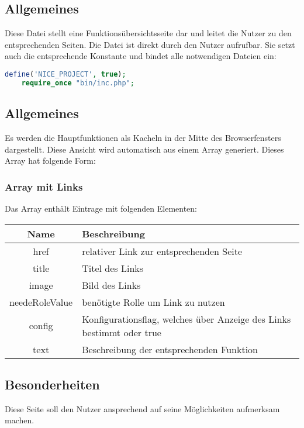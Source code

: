 \subsection{Allgemeines} Diese Datei stellt eine Funktionsübersichtsseite dar und leitet die Nutzer zu den entsprechenden Seiten.
Die Datei ist direkt durch den Nutzer aufrufbar. Sie setzt auch die entsprechende Konstante und bindet alle notwendigen Dateien ein:
\begin{lstlisting}[language=php]
	define('NICE_PROJECT', true);
	require_once "bin/inc.php";
\end{lstlisting}
\subsection{Allgemeines}
Es werden die Hauptfunktionen als Kacheln in der Mitte des Browserfensters dargestellt. Diese Ansicht wird automatisch aus einem Array generiert. Dieses Array hat folgende Form:
\subsubsection{Array mit Links} Das Array enthält Eintrage mit folgenden Elementen:
\begin{table}[H]
	\begin{tabular}{|c|p{11cm}|}
		\hline
		\textbf{Name} & \textbf{Beschreibung} \\ \hline
		href           & relativer Link zur entsprechenden Seite \\ \hline
		title          & Titel des Links \\ \hline
		image          & Bild des Links \\ \hline
		needeRoleValue & benötigte Rolle um Link zu nutzen \\ \hline
		config         & Konfigurationsflag, welches über Anzeige des Links bestimmt oder {\glqq true\grqq} \\ \hline
		text           & Beschreibung der entsprechenden Funktion \\ \hline
	\end{tabular}
\end{table}
\subsection{Besonderheiten}
Diese Seite soll den Nutzer ansprechend auf seine Möglichkeiten aufmerksam machen.